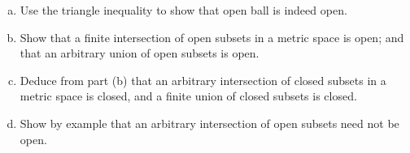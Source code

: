 \documentclass[11pt,letterpaper]{article}
\begin{document}
\begin{problem}\noindent
    \begin{enumerate}[(a)]
        \item Use the triangle inequality to show that open ball is indeed open.
        \item Show that a finite intersection of open subsets in a metric space is open; and that an arbitrary union of open subsets is open.
        \item Deduce from part (b) that an arbitrary intersection of closed subsets in a metric space is closed, and a finite union of closed subsets is closed.
        \item Show by example that an arbitrary intersection of open subsets need not be open.
    \end{enumerate}
\end{problem}
\end{document}
